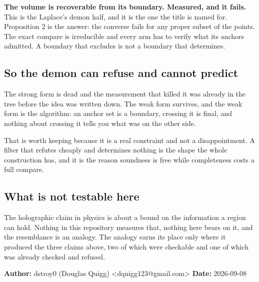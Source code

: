 \textbf{The volume is recoverable from its boundary. Measured, and it fails.} This is the Laplace's demon half, and it is the one the title is named for. Proposition 2 is the answer: the converse fails for any proper subset of the points. The exact compare is irreducible and every arm has to verify what its anchors admitted. A boundary that excludes is not a boundary that determines.

\subsection{So the demon can refuse and cannot predict}

The strong form is dead and the measurement that killed it was already in the tree before the idea was written down. The weak form survives, and the weak form is the algorithm: an anchor set is a boundary, crossing it is final, and nothing about crossing it tells you what was on the other side.

That is worth keeping because it is a real constraint and not a disappointment. A filter that refutes cheaply and determines nothing is the shape the whole construction has, and it is the reason soundness is free while completeness costs a full compare.

\subsection{What is not testable here}

The holographic claim in physics is about a bound on the information a region can hold. Nothing in this repository measures that, nothing here bears on it, and the resemblance is an analogy. The analogy earns its place only where it produced the three claims above, two of which were checkable and one of which was already checked and refused.

\textbf{Author:} dstroy0 (Douglas Quigg) <dquigg123@gmail.com> \textbf{Date:} 2026-09-08

